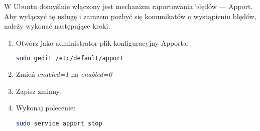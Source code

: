 W Ubuntu domyślnie włączony jest mechanizm raportowania błędów --- Apport. Aby wyłączyć tę usługę i zarazem pozbyć się komunikatów o wystąpieniu błędów, należy wykonać następujące kroki:
\begin{enumerate}
\item Otwórz jako administrator plik konfiguracyjny Apporta:
\begin{lstlisting}[language=bash]
sudo gedit /etc/default/apport
\end{lstlisting}
\item Zmień \textit{enabled=1} na \textit{enabled=0}
\item Zapisz zmiany.
\item Wykonaj polecenie:
\begin{lstlisting}[language=bash]
sudo service apport stop
\end{lstlisting}
\end{enumerate}
